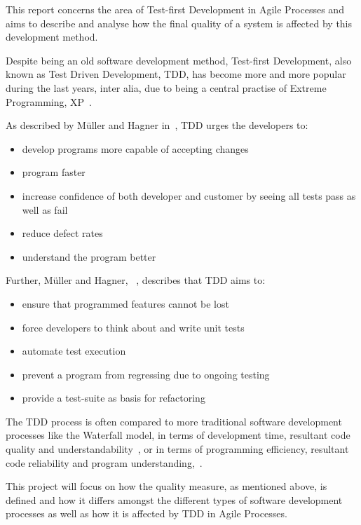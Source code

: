

This report concerns the area of Test-first Development in Agile Processes and aims to describe and analyse how the final quality of a system is affected by this development method. 

Despite being an old software development method, Test-first Development, also known as Test Driven Development, TDD, has become more and more popular during the last years, inter alia, due to being a central practise of Extreme Programming, XP~\cite{georgeandwilliams}. 

As described by M\"{u}ller and Hagner in~\cite{mullerandhagner}, TDD urges the developers to:
\begin{itemize}
\item	develop programs more capable of accepting changes
\item 	program faster
\item	increase confidence of both developer and customer by seeing all tests pass as well as fail
\item 	reduce defect rates 
\item	understand the program better
\end{itemize}

\noindent Further, M\"{u}ller and Hagner, ~\cite{mullerandhagner}, describes that TDD aims to:
\begin{itemize}
\item 	ensure that programmed features cannot be lost
\item 	force developers to think about and write unit tests 
\item	automate test execution
\item	prevent a program from regressing due to ongoing testing
\item 	provide a test-suite as basis for refactoring
\end{itemize}

\noindent The TDD process is often compared to more traditional software development processes like the Waterfall model, in terms of development time, resultant code quality and understandability~\cite{georgeandwilliams}, or in terms of programming efficiency, resultant code reliability and program understanding,~\cite{mullerandhagner}. 

This project will focus on how the quality measure, as mentioned above, is defined and how it differs amongst the different types of software development processes as well as how it is affected by TDD in Agile Processes. 